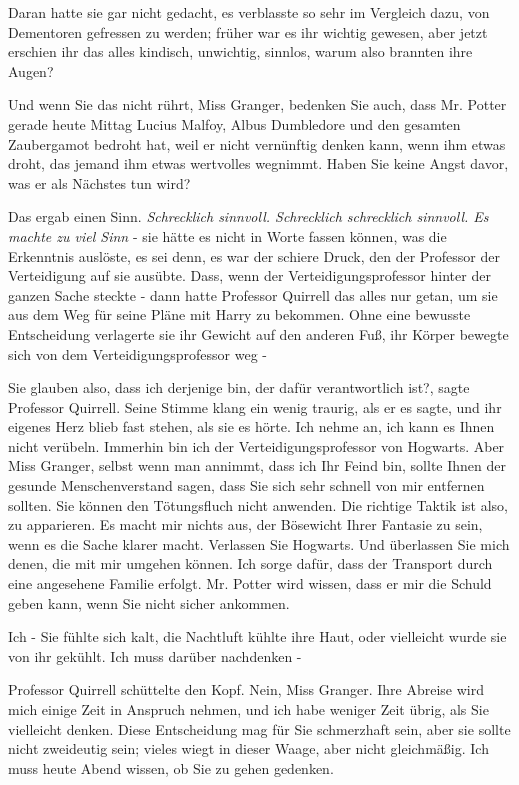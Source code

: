 Daran hatte sie gar nicht gedacht, es verblasste so sehr im Vergleich dazu, von
Dementoren gefressen zu werden; früher war es ihr wichtig gewesen, aber jetzt
erschien ihr das alles kindisch, unwichtig, sinnlos, warum also brannten ihre
Augen?

\glqq Und wenn Sie das nicht rührt, Miss Granger, bedenken Sie auch, dass Mr.
Potter gerade heute Mittag Lucius Malfoy, Albus Dumbledore und den gesamten
Zaubergamot bedroht hat, weil er nicht vernünftig denken kann, wenn ihm etwas
droht, das jemand ihm etwas wertvolles wegnimmt. Haben Sie keine Angst davor,
was er als Nächstes tun wird?\grqq{}

Das ergab einen Sinn. \emph{Schrecklich sinnvoll. Schrecklich schrecklich
sinnvoll. Es machte zu viel Sinn }- sie hätte es nicht in Worte fassen können,
was die Erkenntnis auslöste, es sei denn, es war der schiere Druck, den der
Professor der Verteidigung auf sie ausübte. Dass, wenn der
Verteidigungsprofessor hinter der ganzen Sache steckte - dann hatte Professor
Quirrell das alles nur getan, um sie aus dem Weg für seine Pläne mit Harry zu
bekommen. Ohne eine bewusste Entscheidung verlagerte sie ihr Gewicht auf den
anderen Fuß, ihr Körper bewegte sich von dem Verteidigungsprofessor weg -

\glqq Sie glauben also, dass ich derjenige bin, der dafür verantwortlich
ist?\grqq{}, sagte Professor Quirrell. Seine Stimme klang ein wenig traurig, als
er es sagte, und ihr eigenes Herz blieb fast stehen, als sie es hörte. \glqq Ich
nehme an, ich kann es Ihnen nicht verübeln. Immerhin bin ich der
Verteidigungsprofessor von Hogwarts. Aber Miss Granger, selbst wenn man annimmt,
dass ich Ihr Feind bin, sollte Ihnen der gesunde Menschenverstand sagen, dass
Sie sich sehr schnell von mir entfernen sollten. Sie können den Tötungsfluch
nicht anwenden. Die richtige Taktik ist also, zu apparieren. Es macht mir nichts
aus, der Bösewicht Ihrer Fantasie zu sein, wenn es die Sache klarer macht.
Verlassen Sie Hogwarts. Und überlassen Sie mich denen, die mit mir umgehen
können. Ich sorge dafür, dass der Transport durch eine angesehene Familie
erfolgt. Mr. Potter wird wissen, dass er mir die Schuld geben kann, wenn Sie
nicht sicher ankommen.

\glqq Ich -\grqq{} Sie fühlte sich kalt, die Nachtluft kühlte ihre Haut, oder
vielleicht wurde sie von ihr gekühlt. \glqq Ich muss darüber nachdenken -\grqq{}

Professor Quirrell schüttelte den Kopf. \glqq Nein, Miss Granger. Ihre Abreise
wird mich einige Zeit in Anspruch nehmen, und ich habe weniger Zeit übrig, als
Sie vielleicht denken. Diese Entscheidung mag für Sie schmerzhaft sein, aber sie
sollte nicht zweideutig sein; vieles wiegt in dieser Waage, aber nicht
gleichmäßig. Ich muss heute Abend wissen, ob Sie zu gehen gedenken.\grqq{}

